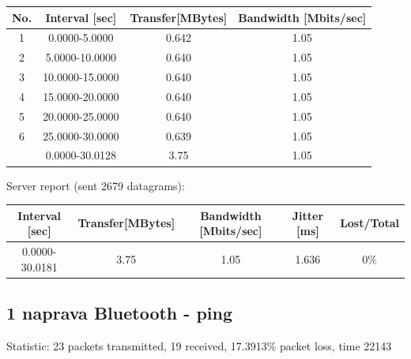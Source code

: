 \documentclass[11pt,a4paper,slovene]{article}
\begin{document}
\begin{table}[H]
	\begin{adjustwidth}{-3cm}{-3cm}
	\centering
		\begin{tabular}{c|c|c|c}
		\hline
		\textbf{No.} & \textbf{Interval [sec]} & \textbf{Transfer[MBytes]} & \textbf{Bandwidth [Mbits/sec]}\\
     		\hline
     		1 & 0.0000-5.0000 & 0.642 & 1.05\\
  		2 & 5.0000-10.0000 & 0.640 & 1.05\\
  		3 & 10.0000-15.0000 & 0.640 & 1.05\\
  		4 & 15.0000-20.0000 & 0.640 & 1.05\\
  		5 & 20.0000-25.0000 & 0.640 & 1.05\\
  		6 & 25.0000-30.0000 & 0.639 & 1.05\\
  		\hline
  		& 0.0000-30.0128 & 3.75 & 1.05\\
  		\hline
    		\end{tabular}
    	\end{adjustwidth}
\end{table}

Server report (sent 2679 datagrams):\\

\begin{table}[H]
	\begin{adjustwidth}{-3cm}{-3cm}
	\centering
		\begin{tabular}{c|c|c|c|c}
		\hline
		\textbf{Interval [sec]} & \textbf{Transfer[MBytes]} & \textbf{Bandwidth [Mbits/sec]} & \textbf{Jitter [ms]} & \textbf{Lost/Total}\\
     		\hline
     		0.0000-30.0181 & 3.75 & 1.05 & 1.636 & 0\%\\
  		\hline
    		\end{tabular}
    	\end{adjustwidth}
\end{table}

\subsection{1 naprava Bluetooth - ping}

Statistic: 23 packets transmitted, 19 received, 17.3913\% packet loss, time 22143
 
\end{document}
